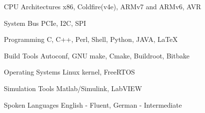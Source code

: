 

\begin{cvskills}

\cvskill
	{CPU Architectures} %
	{x86, Coldfire(v4e), ARMv7 and ARMv6, AVR} %

\cvskill
	{System Bus} %
	{PCIe, I2C, SPI} %

  \cvskill
    {Programming} %
    {C, C++, Perl, Shell, Python, JAVA, LaTeX} %
    
  \cvskill
  	{Build Tools} %
  	{Autoconf, GNU make, Cmake, Buildroot, Bitbake} %

  \cvskill
    {Operating Systems} %
    {Linux kernel, FreeRTOS} %

  \cvskill
    {Simulation Tools} %
    {Matlab/Simulink, LabVIEW} %

  \cvskill
    {Spoken Languages} %
    {English - Fluent, German - Intermediate} %

\end{cvskills}
